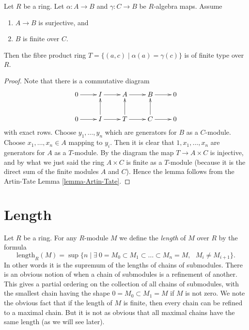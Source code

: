 \begin{lemma}
\label{lemma-fibre-product-finite-type}
Let $R$ be a ring.
Let $\alpha : A \to B$ and $\gamma : C \to B$ be $R$-algebra maps.
Assume
\begin{enumerate}
\item $A \to B$ is surjective, and
\item $B$ is finite over $C$.
\end{enumerate}
Then the fibre product ring $T = \{(a, c) \mid \alpha(a) = \gamma(c)\}$
is of finite type over $R$.
\end{lemma}

\begin{proof}
Note that there is a commutative diagram
$$
\xymatrix{
0 \ar[r] &
I \ar[r] &
A \ar[r] &
B \ar[r] &
0 \\
0 \ar[r] &
I \ar[r] \ar[u] &
T \ar[r] \ar[u] &
C \ar[r] \ar[u] &
0
}
$$
with exact rows. Choose $y_1, \ldots, y_n$ which are generators for
$B$ as a $C$-module. Choose $x_1, \ldots, x_n \in A$ mapping to $y_i$.
Then it is clear that $1, x_1, \ldots, x_n$ are generators for
$A$ as a $T$-module. By the diagram the map
$T \to A \times C$ is injective, and by what we just said the
ring $A \times C$ is finite as a $T$-module (because it is the
direct sum of the finite modules $A$ and $C$).
Hence the lemma follows from the Artin-Tate Lemma \ref{lemma-Artin-Tate}.
\end{proof}






















\section{Length}
\label{section-length}

\noindent
Let $R$ be a ring. For any $R$-module $M$
we define the {\it length} of $M$ over $R$ by the
formula
$$
\text{length}_R(M)
=
\sup
\{
n
\mid
\exists\ 0 = M_0 \subset M_1 \subset \ldots \subset M_n = M,
\text{ }M_i \not= M_{i + 1}
\}.
$$
In other words it is the supremum of the lengths of chains
of submodules. There is an obvious notion of when a chain
of submodules is a refinement of another. This gives a partial
ordering on the collection of all chains of submodules,
with the smallest chain having the shape $0 = M_0 \subset M_1 = M$
if $M$ is not zero.
We note the obvious fact that if the length of
$M$ is finite, then every chain can be refined to a
maximal chain. But it is not as obvious that all maximal
chains have the same length (as we will see later).

